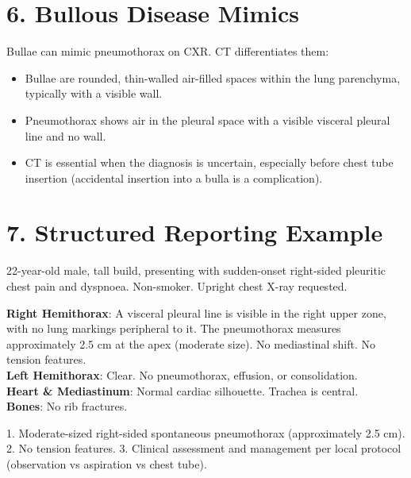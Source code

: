 \section{6. Bullous Disease Mimics}

Bullae can mimic pneumothorax on CXR. CT differentiates them:
\begin{itemize}
  \item Bullae are rounded, thin-walled air-filled spaces within the lung parenchyma, typically with a visible wall.
  \item Pneumothorax shows air in the pleural space with a visible visceral pleural line and no wall.
  \item CT is essential when the diagnosis is uncertain, especially before chest tube insertion (accidental insertion into a bulla is a complication).
\end{itemize}


\section{7. Structured Reporting Example}

\begin{testbox}[Indications:]
22-year-old male, tall build, presenting with sudden-onset right-sided pleuritic chest pain and dyspnoea. Non-smoker. Upright chest X-ray requested.
\end{testbox}
\begin{refbox}[Findings:]
\textbf{Right Hemithorax}: A visceral pleural line is visible in the right upper zone, with no lung markings peripheral to it. The pneumothorax measures approximately 2.5 cm at the apex (moderate size). No mediastinal shift. No tension features.\\
\textbf{Left Hemithorax}: Clear. No pneumothorax, effusion, or consolidation.\\
\textbf{Heart \& Mediastinum}: Normal cardiac silhouette. Trachea is central.\\
\textbf{Bones}: No rib fractures.
\end{refbox}
\begin{pearlbox}[Impression:]
1. Moderate-sized right-sided spontaneous pneumothorax (approximately 2.5 cm).
2. No tension features.
3. Clinical assessment and management per local protocol (observation vs aspiration vs chest tube).
\end{pearlbox}

\clearpage
